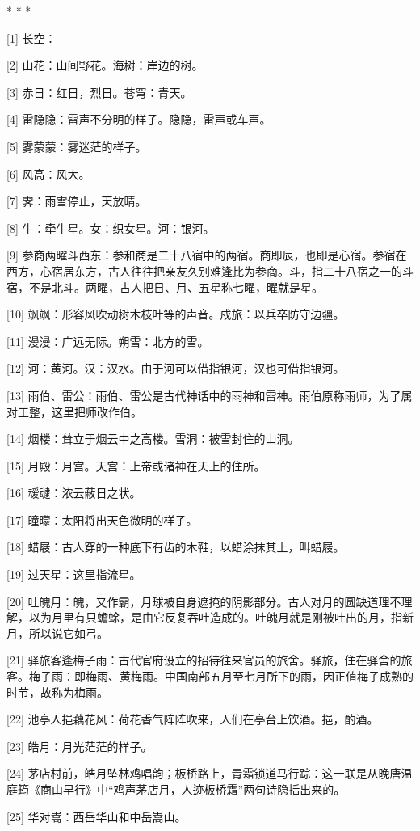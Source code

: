 \documentclass[12pt,UTF8]{ctexbook}
\begin{document}
* * *



[1] 长空：

[2] 山花：山间野花。海树：岸边的树。

[3] 赤日：红日，烈日。苍穹：青天。

[4] 雷隐隐：雷声不分明的样子。隐隐，雷声或车声。

[5] 雾蒙蒙：雾迷茫的样子。

[6] 风高：风大。

[7] 霁：雨雪停止，天放晴。

[8] 牛：牵牛星。女：织女星。河：银河。

[9] 参商两曜斗西东：参和商是二十八宿中的两宿。商即辰，也即是心宿。参宿在西方，心宿居东方，古人往往把亲友久别难逢比为参商。斗，指二十八宿之一的斗宿，不是北斗。两曜，古人把日、月、五星称七曜，曜就是星。

[10] 飒飒：形容风吹动树木枝叶等的声音。戍旅：以兵卒防守边疆。

[11] 漫漫：广远无际。朔雪：北方的雪。

[12] 河：黄河。汉：汉水。由于河可以借指银河，汉也可借指银河。

[13] 雨伯、雷公：雨伯、雷公是古代神话中的雨神和雷神。雨伯原称雨师，为了属对工整，这里把师改作伯。

[14] 烟楼：耸立于烟云中之高楼。雪洞：被雪封住的山洞。

[15] 月殿：月宫。天宫：上帝或诸神在天上的住所。

[16] 叆叇：浓云蔽日之状。

[17] 曈曚：太阳将出天色微明的样子。

[18] 蜡屐：古人穿的一种底下有齿的木鞋，以蜡涂抹其上，叫蜡屐。

[19] 过天星：这里指流星。

[20] 吐魄月：魄，又作霸，月球被自身遮掩的阴影部分。古人对月的圆缺道理不理解，以为月里有只蟾蜍，是由它反复吞吐造成的。吐魄月就是刚被吐出的月，指新月，所以说它如弓。

[21] 驿旅客逢梅子雨：古代官府设立的招待往来官员的旅舍。驿旅，住在驿舍的旅客。梅子雨：即梅雨、黄梅雨。中国南部五月至七月所下的雨，因正值梅子成熟的时节，故称为梅雨。

[22] 池亭人挹藕花风：荷花香气阵阵吹来，人们在亭台上饮酒。挹，酌酒。

[23] 皓月：月光茫茫的样子。

[24] 茅店村前，皓月坠林鸡唱韵；板桥路上，青霜锁道马行踪：这一联是从晚唐温庭筠《商山早行》中“鸡声茅店月，人迹板桥霜”两句诗隐括出来的。

[25] 华对嵩：西岳华山和中岳嵩山。
\end{document}
